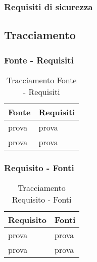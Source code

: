 \subsubsection{Requisiti di sicurezza}

\subsection{Tracciamento}

\subsubsection{Fonte - Requisiti}
\begin{table}[h!]
    \centering
    \renewcommand{\arraystretch}{1.6} %
    \begin{tabularx}{0.8\textwidth}{|>{\centering\arraybackslash}p{2.8cm}|>{\centering\arraybackslash}X|} \hline
    \rowcolor[HTML]{FFD700} 
    \textbf{Fonte} & \textbf{Requisiti} \\ \hline
    prova & prova \\ \hline
    prova & prova \\ \hline
    \end{tabularx}
    \caption{Tracciamento Fonte - Requisiti}
    \label{tab:Tracciamento_fonte_requisiti}
\end{table}


\subsubsection{Requisito - Fonti}
\begin{table}[h!]
    \centering
    \renewcommand{\arraystretch}{1.6} %
    \begin{tabularx}{0.8\textwidth}{|>{\centering\arraybackslash}p{2.8cm}|>{\centering\arraybackslash}X|} \hline
    \rowcolor[HTML]{FFD700} 
    \textbf{Requisito} & \textbf{Fonti} \\ \hline
    prova & prova \\ \hline
    prova & prova \\ \hline
    \end{tabularx}
    \caption{Tracciamento Requisito - Fonti}
    \label{tab:Tracciamento_requisiti_fonti}
\end{table}